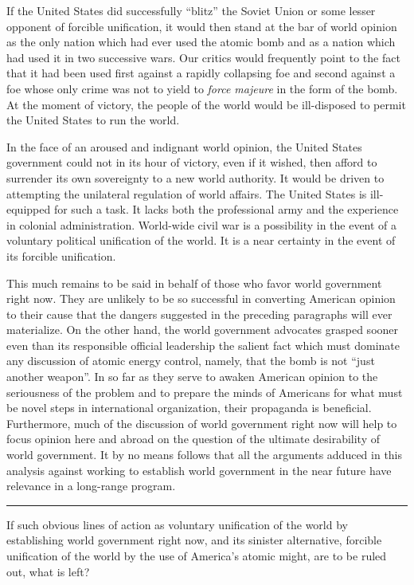 If the United States did successfully ``blitz'' the Soviet Union or some lesser opponent of forcible unification, it would then stand at the bar of world opinion as the only nation which had ever used the atomic bomb and as a nation which had used it in two successive wars. Our critics would frequently point to the fact that it had been used first against a rapidly collapsing foe and second against a foe whose only crime was not to yield to \emph{force majeure} in the form of the bomb. At the moment of victory, the people of the world would be ill-disposed to permit the United States to run the world.

In the face of an aroused and indignant world opinion, the United States government could not in its hour of victory, even if it wished, then afford to surrender its own sovereignty to a new world authority. It would be driven to attempting the unilateral regulation of world affairs. The United States is ill-equipped for such a task. It lacks both the professional army and the experience in colonial administration. World-wide civil war is a possibility in the event of a voluntary political unification of the world. It is a near certainty in the event of its forcible unification.

This much remains to be said in behalf of those who favor world government right now. They are unlikely to be so successful in converting American opinion to their cause that the dangers suggested in the preceding paragraphs will ever materialize. On the other hand, the world government advocates grasped sooner even than its responsible official leadership the salient fact which must dominate any discussion of atomic energy control, namely, that the bomb is not ``just another weapon''. In so far as they serve to awaken American opinion to the seriousness of the problem and to prepare the minds of Americans for what must be novel steps in international organization, their propaganda is beneficial. Furthermore, much of the discussion of world government right now will help to focus opinion here and abroad on the question of the ultimate desirability of world government. It by no means follows that all the arguments adduced in this analysis against working to establish world government in the near future have relevance in a long-range program.

\noindent\hfil\rule{0.4\textwidth}{.4pt}\hfil

\vspace{4pt}

If such obvious lines of action as voluntary unification of the world by establishing world government right now, and its sinister alternative, forcible unification of the world by the use of America's atomic might, are to be ruled out, what is left?

